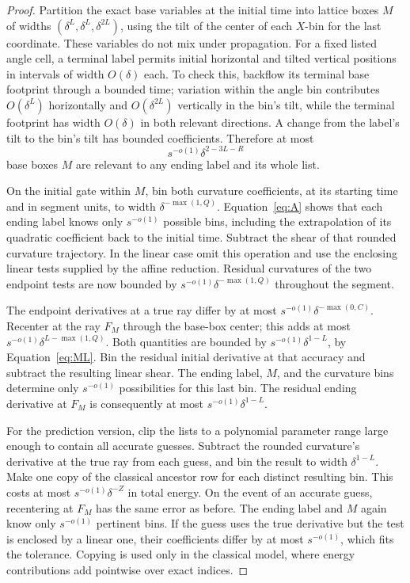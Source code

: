 \begin{proof}
Partition the exact base variables at the initial time into lattice
boxes $M$ of widths $(\delta^L,\delta^L,\delta^{2L})$, using the tilt
of the center of each $X$-bin for the last coordinate. These variables
do not mix under propagation. For a fixed listed angle cell, a terminal
label permits initial horizontal and tilted vertical positions in
intervals of width $O(\delta)$ each. To check this, backflow its terminal
base footprint through a bounded time; variation within the angle bin
contributes $O(\delta^L)$ horizontally and $O(\delta^{2L})$ vertically
in the bin's tilt, while the terminal footprint has width $O(\delta)$
in both relevant directions. A change from the label's tilt to the
bin's tilt has bounded coefficients. Therefore at most
\[
 s^{-o(1)}\delta^{2-3L-R}
\]
base boxes $M$ are relevant to any ending label and its whole list.

On the initial gate within $M$, bin both curvature coefficients, at its
starting time and in segment units, to width
$\delta^{-\max(1,Q)}$. Equation~\eqref{eq:A} shows that each ending
label knows only $s^{-o(1)}$ possible bins, including the extrapolation
of its quadratic coefficient back to the initial time. Subtract the
shear of that rounded curvature trajectory. In the linear case omit
this operation and use the enclosing linear tests supplied by the
affine reduction. Residual curvatures of the two endpoint tests are now
bounded by $s^{-o(1)}\delta^{-\max(1,Q)}$ throughout the segment.

The endpoint derivatives at a true ray differ by at most
$s^{-o(1)}\delta^{-\max(0,C)}$. Recenter at the ray $F_M$ through the
base-box center; this adds at most
$s^{-o(1)}\delta^{L-\max(1,Q)}$. Both quantities are bounded by
$s^{-o(1)}\delta^{1-L}$, by Equation~\eqref{eq:ML}. Bin the residual
initial derivative at that accuracy and subtract the resulting linear
shear. The ending label, $M$, and the curvature bins determine only
$s^{-o(1)}$ possibilities for this last bin. The residual ending
derivative at $F_M$ is consequently at most
$s^{-o(1)}\delta^{1-L}$.

For the prediction version, clip the lists to a polynomial parameter
range large enough to contain all accurate guesses. Subtract the
rounded curvature's derivative at the true ray from each guess, and bin
the result to width $\delta^{1-L}$. Make one copy of the classical
ancestor row for each distinct resulting bin. This costs at most
$s^{-o(1)}\delta^{-Z}$ in total energy. On the event of an accurate
guess, recentering at $F_M$ has the same error as before. The ending
label and $M$ again know only $s^{-o(1)}$ pertinent bins. If the guess
uses the true derivative but the test is enclosed by a linear one,
their coefficients differ by at most $s^{-o(1)}$, which fits the
tolerance. Copying is used only in the classical model, where energy
contributions add pointwise over exact indices.


\end{proof}
